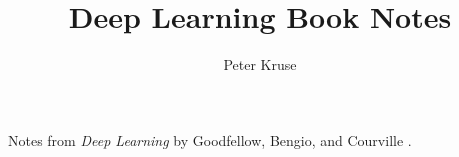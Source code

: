 \documentclass{article}
\title{Deep Learning Book Notes}
\author{Peter Kruse}
\begin{document}
\maketitle

Notes from \textit{Deep Learning} by Goodfellow, Bengio, and Courville \cite{deeplearningbook}.

\tableofcontents




\end{document}
